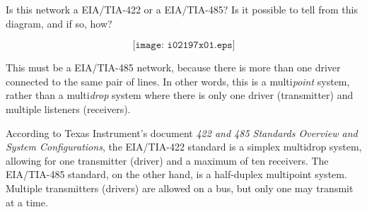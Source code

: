 

Is this network a EIA/TIA-422 or a EIA/TIA-485?  Is it possible to tell from this diagram, and if so, how?

$$\texttt{[image: i02197x01.eps]}$$







This must be a EIA/TIA-485 network, because there is more than one driver connected to the same pair of lines.  In other words, this is a multi{\it point} system, rather than a multi{\it drop} system where there is only one driver (transmitter) and multiple listeners (receivers).







According to Texas Instrument's document {\it 422 and 485 Standards Overview and System Configurations}, the EIA/TIA-422 standard is a simplex multidrop system, allowing for one transmitter (driver) and a maximum of ten receivers.  The EIA/TIA-485 standard, on the other hand, is a half-duplex multipoint system.  Multiple transmitters (drivers) are allowed on a bus, but only one may transmit at a time.




